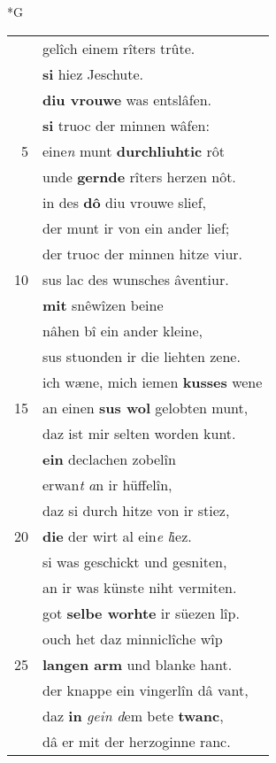 \documentclass[8pt,a4paper,notitlepage]{article}
\begin{document}
\newpage
\begin{table}[ht]
\begin{minipage}[t]{0.5\linewidth}
\small
\begin{center}*G
\end{center}
\begin{tabular}{rl}
 & gelîch einem rîters trûte.\\ 
 & \textbf{si} hiez Jeschute.\\ 
 & \textbf{diu vrouwe} was entslâfen.\\ 
 & \textbf{si} truoc der minnen wâfen:\\ 
5 & eine\textit{n} munt \textbf{durchliuhtic} rôt\\ 
 & unde \textbf{gernde} rîters herzen nôt.\\ 
 & in des \textbf{dô} diu vrouwe slief,\\ 
 & der munt ir von ein ander lief;\\ 
 & der truoc der minnen hitze viur.\\ 
10 & sus lac des wunsches âventiur.\\ 
 & \textbf{mit} snêwîzen beine\\ 
 & nâhen bî ein ander kleine,\\ 
 & sus stuonden ir die liehten zene.\\ 
 & ich wæne, mich iemen \textbf{kusses} wene\\ 
15 & an einen \textbf{sus wol} gelobten munt,\\ 
 & daz ist mir selten worden kunt.\\ 
 & \textbf{ein} declachen zobelîn\\ 
 & erwan\textit{t} \textit{a}n ir hüffelîn,\\ 
 & daz si durch hitze von ir stiez,\\ 
20 & \textbf{die} der wirt al ein\textit{e} \textit{l}iez.\\ 
 & si was geschickt und gesniten,\\ 
 & an ir was künste niht vermiten.\\ 
 & got \textbf{selbe worhte} ir süezen lîp.\\ 
 & ouch het daz minniclîche wîp\\ 
25 & \textbf{langen arm} und blanke hant.\\ 
 & der knappe ein vingerlîn dâ vant,\\ 
 & daz \textbf{in} \textit{gein d}em bete \textbf{twanc},\\ 
 & dâ er mit der herzoginne ranc.\\ 

\end{tabular}
\end{minipage}
\end{table}
\end{document}
